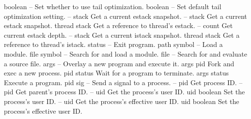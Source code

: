 \begin{longtable}{}
\hline
\optableent
	{boolean}
	{{\bf {}}}
	{--}
	{Set whether to use tail optimization.}
\hline
\optableent
	{boolean}
	{{\bf {}}}
	{--}
	{Set default tail optimization setting.}
\hline
\optableent
	{--}
	{{\bf {}}}
	{stack}
	{Get a current estack snapshot.}
\hline
\optableent
	{--}
	{{\bf {}}}
	{stack}
	{Get a current estack snapshot.}
\hline
\optableent
	{thread}
	{{\bf {}}}
	{stack}
	{Get a reference to thread's estack.}
\hline
\optableent
	{--}
	{{\bf {}}}
	{count}
	{Get current estack depth.}
\hline
\optableent
	{--}
	{{\bf {}}}
	{stack}
	{Get a current istack snapshot.}
\hline
\optableent
	{thread}
	{{\bf {}}}
	{stack}
	{Get a reference to thread's istack.}
\hline
\optableent
	{status}
	{{\bf {}}}
	{--}
	{Exit program.}
\hline
\optableent
	{path symbol}
	{{\bf {}}}
	{--}
	{Load a module.}
\hline
\optableent
	{file symbol}
	{{\bf {}}}
	{--}
	{Search for and load a module.}
\hline
\optableent
	{file}
	{{\bf {}}}
	{--}
	{Search for and evaluate a source file.}
\hline
\optableent
	{args}
	{{\bf {}}}
	{--}
	{Overlay a new program and execute it.}
\hline
\optableent
	{args}
	{{\bf {}}}
	{pid}
	{Fork and exec a new process.}
\hline
\optableent
	{pid}
	{{\bf {}}}
	{status}
	{Wait for a program to terminate.}
\hline
\optableent
	{args}
	{{\bf {}}}
	{status}
	{Execute a program.}
\hline
\optableent
	{pid sig}
	{{\bf {}}}
	{--}
	{Send a signal to a process.}
\hline
\optableent
	{--}
	{{\bf {}}}
	{pid}
	{Get process ID.}
\hline
\optableent
	{--}
	{{\bf {}}}
	{pid}
	{Get parent's process ID.}
\hline
\optableent
	{--}
	{{\bf {}}}
	{uid}
	{Get the process's user ID.}
\hline
\optableent
	{uid}
	{{\bf {}}}
	{boolean}
	{Set the process's user ID.}
\hline
\optableent
	{--}
	{{\bf {}}}
	{uid}
	{Get the process's effective user ID.}
\hline
\optableent
	{uid}
	{{\bf {}}}
	{boolean}
	{Set the process's effective user ID.}

\end{longtable}

